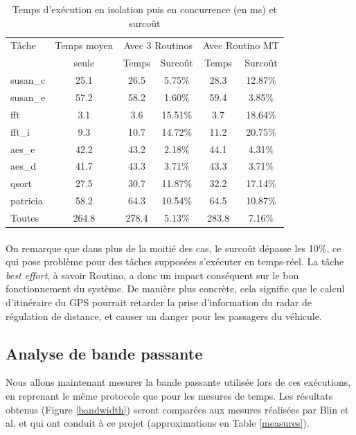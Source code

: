 \begin{table}[h]
\centering
\begin{tabular}{l|c|c|c|c|c}
Tâche & Temps moyen & \multicolumn{2}{c|}{Avec 3 Routinos} & 
\multicolumn{2}{c}{Avec Routino MT} \\
 & seule & Temps & Surcoût & Temps & Surcoût\\
\hline
susan\_c & 25.1 & 26.5 & 5.75\%  & 28.3 & 12.87\%\\
susan\_e & 57.2 & 58.2 & 1.60\%  & 59.4 & 3.85\%\\
fft      & 3.1  & 3.6  & 15.51\% & 3.7  & 18.64\%\\
fft\_i   & 9.3  & 10.7 & 14.72\% & 11.2 & 20.75\%\\
aes\_e   & 42.2 & 43.2 & 2.18\%  & 44.1 & 4.31\%\\
aes\_d   & 41.7 & 43.3 & 3.71\%  & 43.3 & 3.71\%\\
qsort    & 27.5 & 30.7 & 11.87\% & 32.2 & 17.14\%\\
patricia & 58.2 & 64.3 & 10.54\% & 64.5 & 10.87\%\\
\hline
Toutes   & 264.8 & 278.4 & 5.13\%  & 283.8 & 7.16\%\\
\end{tabular}
\caption{Temps d'exécution en isolation puis en concurrence (en ms) et surcoût}
\label{timebench}
\end{table}

\paragraph{}
On remarque que dans plus de la moitié des cas, le surcoût dépasse les 10\%, ce
qui pose problème pour des tâches supposées s'exécuter en temps-réel. La tâche
\textit{best effort}, à savoir Routino, a donc un impact conséquent sur le bon
fonctionnement du système. De manière plus concrète, cela signifie que le 
calcul d'itinéraire du GPS pourrait retarder la prise d'information du radar
de régulation de distance, et causer un danger pour les passagers du véhicule.

\subsection{Analyse de bande passante}
Nous allons maintenant mesurer la bande passante utilisée lors de ces
exécutions, en reprenant le même protocole que pour les mesures de temps. Les
résultats obtenus (Figure \ref{bandwidth}) seront comparées aux
mesures réalisées par Blin et al. \cite{blin_protecting_2015} et qui ont
conduit à ce projet (approximations en Table \ref{measures}).

